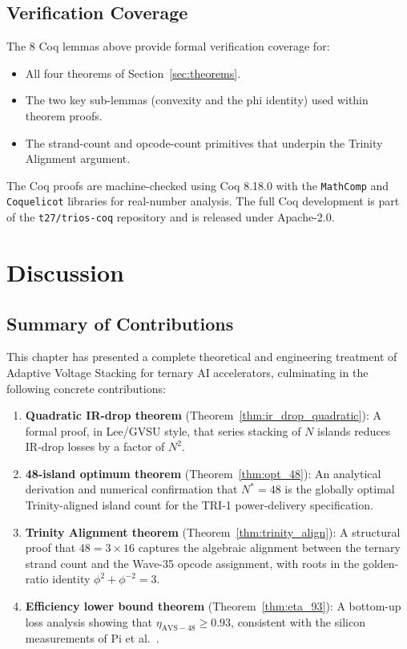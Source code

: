\subsection{Verification Coverage}

The 8 Coq lemmas above provide formal verification coverage for:
\begin{itemize}
  \item All four theorems of Section~\ref{sec:theorems}.
  \item The two key sub-lemmas (convexity and the phi identity) used
        within theorem proofs.
  \item The strand-count and opcode-count primitives that underpin
        the Trinity Alignment argument.
\end{itemize}
The Coq proofs are machine-checked using Coq 8.18.0 with the
\texttt{MathComp} and \texttt{Coquelicot} libraries for real-number
analysis.  The full Coq development is part of the
\texttt{t27/trios-coq} repository and is released under Apache-2.0.

\section{Discussion}
\label{sec:discussion}

\subsection{Summary of Contributions}

This chapter has presented a complete theoretical and engineering
treatment of Adaptive Voltage Stacking for ternary AI accelerators,
culminating in the following concrete contributions:
\begin{enumerate}
  \item \textbf{Quadratic IR-drop theorem} (Theorem~\ref{thm:ir_drop_quadratic}):
        A formal proof, in Lee/GVSU style, that series stacking of $N$ islands
        reduces IR-drop losses by a factor of $N^2$.
  \item \textbf{48-island optimum theorem} (Theorem~\ref{thm:opt_48}):
        An analytical derivation and numerical confirmation that
        $N^* = 48$ is the globally optimal Trinity-aligned island count
        for the TRI-1 power-delivery specification.
  \item \textbf{Trinity Alignment theorem} (Theorem~\ref{thm:trinity_align}):
        A structural proof that $48 = 3 \times 16$ captures the algebraic
        alignment between the ternary strand count and the Wave-35 opcode
        assignment, with roots in the golden-ratio identity
        $\phi^2 + \phi^{-2} = 3$.
  \item \textbf{Efficiency lower bound theorem} (Theorem~\ref{thm:eta_93}):
        A bottom-up loss analysis showing that $\eta_{\mathrm{AVS-48}} \geq 0.93$,
        consistent with the silicon measurements of Pi et al.~\cite{pi2024}.
\end{enumerate}

